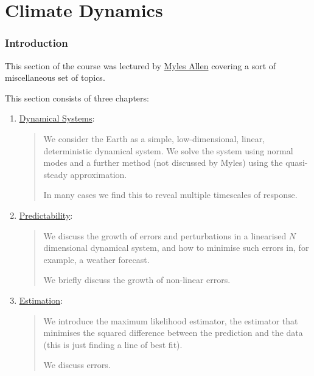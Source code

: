 \part{Climate Dynamics}\label{Climate Dynamics}

\section*{Introduction}

This section of the course was lectured by \href{https://www.physics.ox.ac.uk/our-people/allenm}{Myles Allen} covering a sort of miscellaneous set of topics.\vspace{5 mm}

\noindent This section consists of three chapters:\vspace{5 mm}

\begin{enumerate}
    \item \hyperref[Dynamical Systems]{Dynamical Systems}: 
        
        \begin{quote}
            We consider the Earth as a simple, low-dimensional, linear, deterministic dynamical system. We solve the system using normal modes and a further method (not discussed by Myles) using the quasi-steady approximation.

            In many cases we find this to reveal multiple timescales of response.
        \end{quote}

    \item \hyperref[Predictability]{Predictability}: 
    
        \begin{quote}
            We discuss the growth of errors and perturbations in a linearised $N$ dimensional dynamical system, and how to minimise such errors in, for example, a weather forecast.

            We briefly discuss the growth of non-linear errors.
        \end{quote}
    
    \item \hyperref[Estimation]{Estimation}:
        
        \begin{quote}
            We introduce the maximum likelihood estimator, the estimator that minimises the squared difference between the prediction and the data (this is just finding a line of best fit).

            We discuss errors.
        \end{quote}
\end{enumerate}

